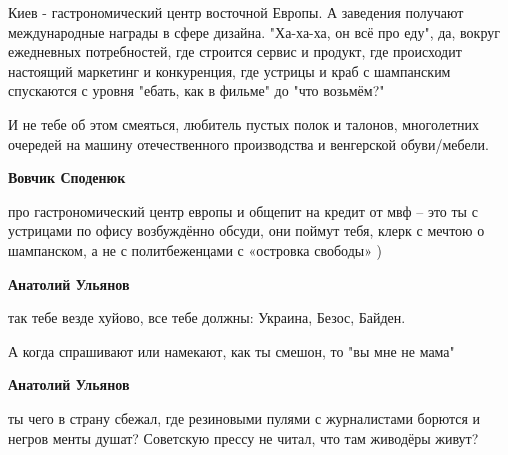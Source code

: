 \begin{itemize}
\begin{itemize}
Киев - гастрономический центр восточной Европы. А заведения получают
международные награды в сфере дизайна. "Ха-ха-ха, он всё про еду", да, вокруг
ежедневных потребностей, где строится сервис и продукт, где происходит
настоящий маркетинг и конкуренция, где устрицы и краб с шампанским спускаются с
уровня "ебать, как в фильме" до "что возьмём?"

И не тебе об этом смеяться, любитель пустых полок и талонов, многолетних
очередей на машину отечественного производства и венгерской обуви/мебели.

 
\textbf{Вовчик Споденюк} 


про гастрономический центр европы и общепит на кредит от мвф – это ты с
устрицами по офису возбуждённо обсуди, они поймут тебя, клерк с мечтою о
шампанском, а не с политбеженцами с «островка свободы» )


 
\textbf{Анатолий Ульянов} 

так тебе везде хуйово, все тебе должны: Украина, Безос, Байден.

А когда спрашивают или намекают, как ты смешон, то "вы мне не мама"


 
\textbf{Анатолий Ульянов} 

ты чего в страну сбежал, где резиновыми пулями с
журналистами борются и негров менты душат? Советскую прессу не читал, что там
живодёры живут?

 

\end{itemize}
\end{itemize}
